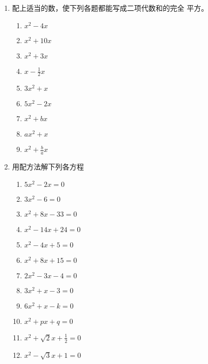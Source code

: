 \begin{enumerate}
\item 配上适当的数，使下列各题都能写成二项代数和的完全
平方。
    \begin{multicols}{2}
        \begin{enumerate}
\item $x^2-4x$
\item $x^2+10x$
\item $x^2+3x$
\item $x-\frac{1}{2}x$
\item $3x^2+x$
\item $5x^2-2x$
\item $x^2+bx$
\item $ ax^2+x$
\item $x^2+\frac{b}{a}x$
\end{enumerate}
\end{multicols}
\item 用配方法解下列各方程
\begin{multicols}{2}
    \begin{enumerate}
\item $5x^2-2x=0$
\item $3x^2-6=0$
\item $x^2+8x-33=0$
\item $x^2-14x+24=0$
\item $x^2-4x+5=0$
\item $x^2+8x+15=0$
\item $2x^2-3x-4=0$
\item $3x^2+x-3=0$
\item $6x^2+x-k=0$
\item $x^2+px+q=0$
\item $x^2+\sqrt{2}x+\frac{1}{2}=0$
\item $x^2-\sqrt{3}x+1=0$
        \end{enumerate}
    \end{multicols}


\end{enumerate}
